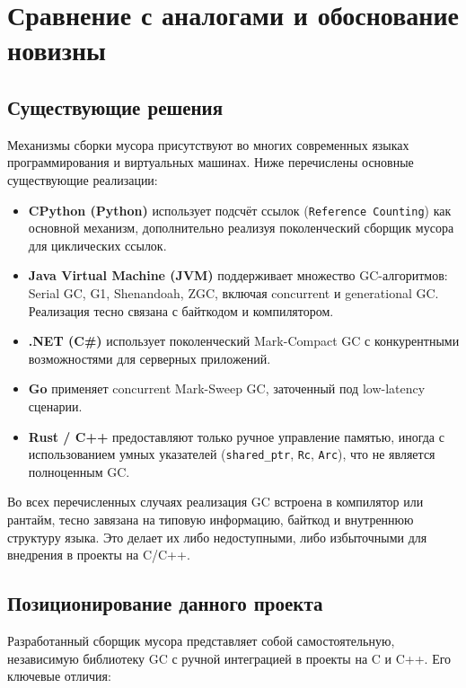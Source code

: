 \section{Сравнение с аналогами и обоснование новизны}

\subsection{Существующие решения}

Механизмы сборки мусора присутствуют во многих современных языках программирования и виртуальных машинах. Ниже перечислены основные существующие реализации:

\begin{itemize}
    \item \textbf{CPython (Python)} использует подсчёт ссылок (\texttt{Reference Counting}) как основной механизм, дополнительно реализуя поколенческий сборщик мусора для циклических ссылок.
    \item \textbf{Java Virtual Machine (JVM)} поддерживает множество GC-алгоритмов: Serial GC, G1, Shenandoah, ZGC, включая concurrent и generational GC. Реализация тесно связана с байткодом и компилятором.
    \item \textbf{.NET (C\#)} использует поколенческий Mark-Compact GC с конкурентными возможностями для серверных приложений.
    \item \textbf{Go} применяет concurrent Mark-Sweep GC, заточенный под low-latency сценарии.
    \item \textbf{Rust / C++} предоставляют только ручное управление памятью, иногда с использованием умных указателей (\texttt{shared\_ptr}, \texttt{Rc}, \texttt{Arc}), что не является полноценным GC.
\end{itemize}

Во всех перечисленных случаях реализация GC встроена в компилятор или рантайм, тесно завязана на типовую информацию, байткод и внутреннюю структуру языка. Это делает их либо недоступными, либо избыточными для внедрения в проекты на C/C++.

\subsection{Позиционирование данного проекта}

Разработанный сборщик мусора представляет собой самостоятельную, независимую библиотеку GC с ручной интеграцией в проекты на C и C++. Его ключевые отличия:

